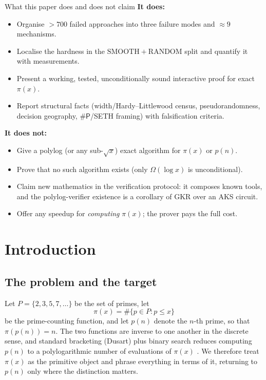 \documentclass[11pt]{article}
\theoremstyle{plain}
\theoremstyle{definition}
\theoremstyle{remark}
\newcommand{\sharpP}{\#\mathsf{P}}
\begin{document}
\begin{claimbox}{What this paper does and does not claim}
\textbf{It does:}
\begin{itemize}[leftmargin=1.4em,itemsep=1pt,topsep=2pt]
  \item Organise ${>}700$ failed approaches into three failure modes and ${\approx}9$ mechanisms.
  \item Localise the hardness in the $\mathrm{SMOOTH}+\mathrm{RANDOM}$ split and quantify it with measurements.
  \item Present a working, tested, unconditionally sound interactive proof for exact $\pi(x)$.
  \item Report structural facts (width/Hardy--Littlewood census, pseudorandomness, decision geography, $\sharpP$/\textsf{SETH} framing) with falsification criteria.
\end{itemize}
\textbf{It does not:}
\begin{itemize}[leftmargin=1.4em,itemsep=1pt,topsep=2pt]
  \item Give a polylog (or any sub-$\sqrt{x}$) exact algorithm for $\pi(x)$ or $p(n)$.
  \item Prove that no such algorithm exists (only $\Omega(\log x)$ is unconditional).
  \item Claim new mathematics in the verification protocol: it composes known tools, and the polylog-verifier existence is a corollary of GKR over an \textsf{AKS} circuit.
  \item Offer any speedup for \emph{computing} $\pi(x)$; the prover pays the full cost.
\end{itemize}
\end{claimbox}

\tableofcontents
\bigskip


\section{Introduction}
\label{sec:intro}

\subsection{The problem and the target}

Let $P=\{2,3,5,7,\dots\}$ be the set of primes, let
\[
  \pi(x)=\#\{p\in P : p\le x\}
\]
be the prime-counting function, and let $p(n)$ denote the $n$-th prime, so that
$\pi(p(n))=n$. The two functions are inverse to one another in the discrete
sense, and standard bracketing (Dusart) plus binary search reduces computing
$p(n)$ to a polylogarithmic number of evaluations of $\pi(x)$
\cite{aggarwal2025,dusart2010}. We therefore treat $\pi(x)$ as the primitive
object and phrase everything in terms of it, returning to $p(n)$ only where the
distinction matters.
\end{document}
